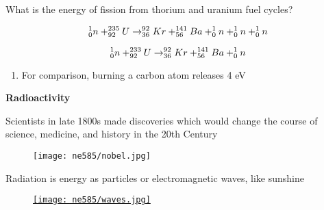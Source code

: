 \documentclass[aspectratio=1610,pdftex,dvipsnames,compress,xcolor={dvipsnames}]{beamer}
\begin{document}
\begin{frame}{What is the energy of fission from thorium and uranium fuel cycles?}

    \begin{equation}
        \LARGE
        ^1_0n + ^{235}_{92}U \rightarrow ^{92}_{36}Kr + ^{141}_{56}Ba + ^1_0n + ^1_0n + ^1_0n  
    \end{equation}

    \begin{equation}
        \LARGE
        ^1_0n + ^{233}_{92}U \rightarrow ^{92}_{36}Kr + ^{141}_{56}Ba + ^1_0n   
    \end{equation}

    \vspace*{\fill}

    \begin{enumerate}[series=outerlist,topsep=0pt,itemsep=21pt,leftmargin=*,label=(\arabic*)]
        \item[]For comparison, burning a carbon atom releases 4 eV
    \end{enumerate}
\end{frame}


\begin{frame}[plain]{}
    \centering\LARGE\textbf{Radioactivity}
\end{frame}


\addtocounter{framenumber}{-1}
\begin{frame}{Scientists in late 1800s made discoveries which would change the course of science, medicine, and history in the 20th Century}
    \begin{figure}
        \centering
        \texttt{[image: ne585/nobel.jpg]}
    \end{figure}
\end{frame}


\begin{frame}{Radiation is energy as particles or electromagnetic waves, like sunshine}
    \begin{figure}
        \centering
        \href{https://www.researchgate.net/profile/Ngai_Chan/publication/277996216/figure/fig5/AS:336497640263680@1457238697222/The-electromagnetic-spectrum-for-different-frequency-bands-and-the-corresponding.jpg}{\texttt{[image: ne585/waves.jpg]}}
    \end{figure}
\end{frame}
\end{document}
